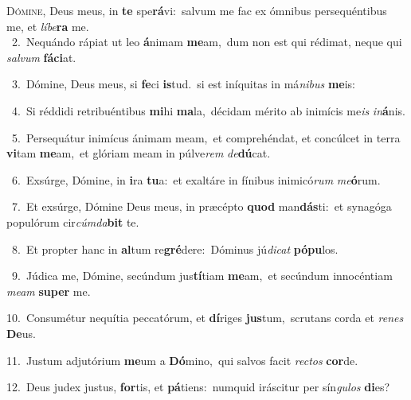 \lettrine{\initial\textcolor{\initialcolor}{D}}{ómine,} Deus meus, in \textbf{te} spe\-\textbf{rá}\-vi:~\star salvum me fac ex ómnibus persequéntibus me, et \textit{lí}\-\textit{be}\textbf{ra} me.\\
{\numbfont\textcolor{\numbcolor}{~2.}}~Nequándo rápiat ut leo \textbf{á}\-nimam \textbf{me}\-am,~\star dum non est qui rédimat, neque qui \textit{sal}\-\textit{vum} \textbf{fá}\-\textbf{ci}at.\par
{\numbfont\textcolor{\numbcolor}{~3.}}~Dómine, Deus meus, si \textbf{fe}\-ci \textbf{is}\-tud.~\star si est iníquitas in má\-\textit{ni}\-\textit{bus} \textbf{me}\-is:\par
{\numbfont\textcolor{\numbcolor}{~4.}}~Si réddidi retribuéntibus \textbf{mi}\-hi \textbf{ma}\-la,~\star décidam mérito ab inimícis me\textit{is} \textit{in}\-\textbf{á}nis.\par
{\numbfont\textcolor{\numbcolor}{~5.}}~Persequátur inimícus ánimam meam,~\dagger et comprehéndat, et concúlcet in terra \textbf{vi}\-tam \textbf{me}\-am,~\star et glóriam meam in púlve\textit{rem} \textit{de}\-\textbf{dú}cat.\par
{\numbfont\textcolor{\numbcolor}{~6.}}~Exsúrge, Dómine, in \textbf{i}\-ra \textbf{tu}\-a:~\star et exaltáre in fínibus inimicó\textit{rum} \textit{me}\-\textbf{ó}rum.\par
{\numbfont\textcolor{\numbcolor}{~7.}}~Et exsúrge, Dómine Deus meus, in præcépto \textbf{quod} man\-\textbf{dás}\-ti:~\star et synagóga populórum cir\-\textit{cúm}\-\textit{da}\textbf{bit} te.\par
{\numbfont\textcolor{\numbcolor}{~8.}}~Et propter hanc in \textbf{al}\-tum re\-\textbf{gré}\-dere:~\star Dóminus jú\-\textit{di}\-\textit{cat} \textbf{pó}\-\textbf{pu}los.\par
{\numbfont\textcolor{\numbcolor}{~9.}}~Júdica me, Dómine, secúndum jus\-\textbf{tí}\-tiam \textbf{me}\-am,~\star et secúndum innocéntiam \textit{me}\-\textit{am} \textbf{su}\-\textbf{per} me.\par
{\numbfont\textcolor{\numbcolor}{10.}}~Consumétur nequítia peccatórum, et \textbf{dí}\-riges \textbf{jus}\-tum,~\star scrutans corda et \textit{re}\-\textit{nes} \textbf{De}\-us.\par
{\numbfont\textcolor{\numbcolor}{11.}}~Justum adjutórium \textbf{me}\-um a \textbf{Dó}\-mino,~\star qui salvos facit \textit{rec}\-\textit{tos} \textbf{cor}\-de.\par
{\numbfont\textcolor{\numbcolor}{12.}}~Deus judex justus, \textbf{for}\-tis, et \textbf{pá}\-tiens:~\star numquid iráscitur per sín\-\textit{gu}\-\textit{los} \textbf{di}\-es?\par

